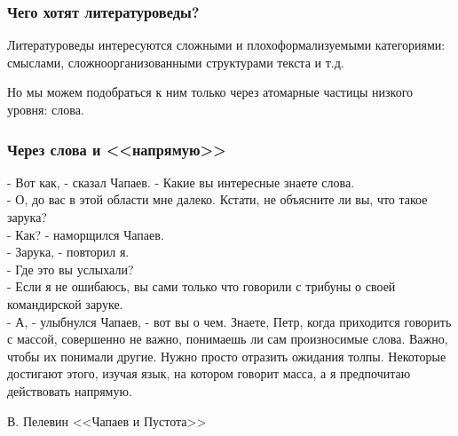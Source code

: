 \documentclass{beamer}
\begin{document}

\begin{frame}
\frametitle{Чего хотят литературоведы?}

Литературоведы интересуются сложными и плохоформализуемыми категориями: смыслами, сложноорганизованными структурами текста и т.д.

Но мы можем подобраться к ним только через атомарные частицы низкого уровня: слова.

\end{frame}

\begin{frame}
\frametitle{Через слова и <<напрямую>>}

\begin{block}
	 - Вот как, - сказал Чапаев. - Какие вы интересные знаете слова.\\
     - О, до вас в этой области мне далеко. Кстати, не  объясните  ли  вы,
что такое зарука?\\
     - Как? - наморщился Чапаев.\\
     - Зарука, - повторил я.\\
     - Где это вы услыхали?\\
     - Если я не ошибаюсь, вы сами только что говорили с трибуны  о  своей
командирской заруке.\\
     - А, - улыбнулся  Чапаев,  -  вот  вы  о  чем.  Знаете,  Петр,  когда
приходится говорить с  массой,  совершенно  не  важно,  понимаешь  ли  сам
произносимые слова. Важно, чтобы их понимали другие. Нужно просто отразить
ожидания толпы. Некоторые достигают этого, изучая язык, на котором говорит
масса, а я предпочитаю  действовать  напрямую. 
\end{block}

В. Пелевин <<Чапаев и Пустота>>

\end{frame}
\end{document}
